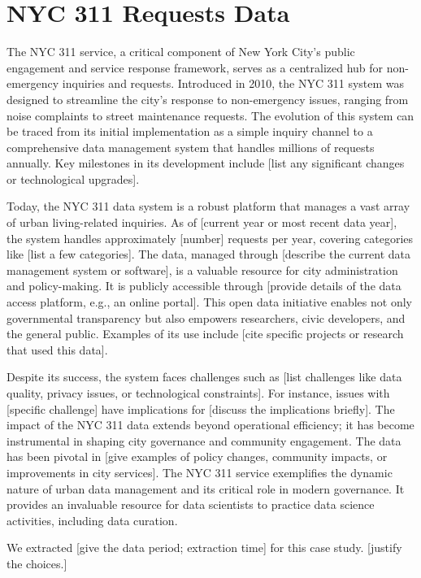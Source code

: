 \documentclass[12pt, titlepage]{article}
\begin{document}
\section{NYC 311 Requests Data} \label{sec:data}

The NYC 311 service, a critical component of New York City's public
engagement and service response framework, serves as a centralized hub
for non-emergency inquiries and requests. Introduced in 2010, the NYC
311 system was designed to streamline the city's response to
non-emergency issues, ranging from noise complaints to street
maintenance requests. The evolution of this system can be traced from
its initial implementation as a simple inquiry channel to a
comprehensive data management system that handles millions of requests
annually. Key milestones in its development include [list any
significant changes or technological upgrades].


Today, the NYC 311 data system is a robust platform that manages a
vast array of urban living-related inquiries. As of [current year or
most recent data year], the system handles approximately [number]
requests per year, covering categories like [list a few
categories]. The data, managed through [describe the current data
management system or software], is a valuable resource for city
administration and policy-making. It is publicly accessible through
[provide details of the data access platform, e.g., an online
portal]. This open data initiative enables not only governmental
transparency but also empowers researchers, civic developers, and the
general public. Examples of its use include [cite specific projects or
research that used this data].


Despite its success, the system faces challenges such as [list
challenges like data quality, privacy issues, or technological
constraints]. For instance, issues with [specific challenge] have
implications for [discuss the implications briefly].
The impact of the NYC 311 data extends beyond operational efficiency;
it has become instrumental in shaping city governance and community
engagement. The data has been pivotal in [give examples of policy
changes, community impacts, or improvements in city services].
The NYC 311 service exemplifies the dynamic nature of urban data
management and its critical role in modern governance. It provides an
invaluable resource for data scientists to practice data science
activities, including data curation.


We extracted [give the data period; extraction time] for this case
study. [justify the choices.]
\end{document}
